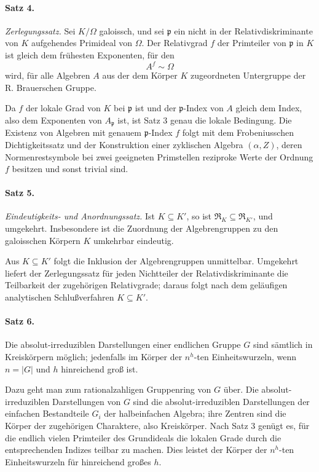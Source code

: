 \documentclass[11pt]{article}
\providecommand{\Om}{\Omega}
\begin{document}
\paragraph{Satz 4.}
\emph{Zerlegungssatz.} Sei \(K/\Om\) galoissch, und sei \(\mathfrak p\) ein nicht in der Relativdiskriminante von \(K\) aufgehendes Primideal von \(\Om\). Der Relativgrad \(f\) der Primteiler von \(\mathfrak p\) in \(K\) ist gleich dem frühesten Exponenten, für den
\[
        A^f\sim\Om
\]
wird, für alle Algebren \(A\) aus der dem Körper \(K\) zugeordneten Untergruppe der R. Brauerschen Gruppe.

Da \(f\) der lokale Grad von \(K\) bei \(\mathfrak p\) ist und der \(\mathfrak p\)-Index von \(A\) gleich dem Index, also dem Exponenten von \(A_{\mathfrak p}\) ist, ist Satz 3 genau die lokale Bedingung. Die Existenz von Algebren mit genauem \(\mathfrak p\)-Index \(f\) folgt mit dem Frobeniusschen Dichtigkeitssatz und der Konstruktion einer zyklischen Algebra \((\alpha,Z)\), deren Normenrestsymbole bei zwei geeigneten Primstellen reziproke Werte der Ordnung \(f\) besitzen und sonst trivial sind.

\paragraph{Satz 5.}
\emph{Eindeutigkeits- und Anordnungssatz.} Ist \(K\subseteq K'\), so ist \(\mathfrak R_K\subseteq\mathfrak R_{K'}\), und umgekehrt. Insbesondere ist die Zuordnung der Algebrengruppen zu den galoisschen Körpern \(K\) umkehrbar eindeutig.

Aus \(K\subseteq K'\) folgt die Inklusion der Algebrengruppen unmittelbar. Umgekehrt liefert der Zerlegungssatz für jeden Nichtteiler der Relativdiskriminante die Teilbarkeit der zugehörigen Relativgrade; daraus folgt nach dem geläufigen analytischen Schlußverfahren \(K\subseteq K'\).

\paragraph{Satz 6.}
Die absolut-irreduziblen Darstellungen einer endlichen Gruppe \(G\) sind sämtlich in Kreiskörpern möglich; jedenfalls im Körper der \(n^h\)-ten Einheitswurzeln, wenn \(n=|G|\) und \(h\) hinreichend groß ist.

Dazu geht man zum rationalzahligen Gruppenring von \(G\) über. Die absolut-irreduziblen Darstellungen von \(G\) sind die absolut-irreduziblen Darstellungen der einfachen Bestandteile \(G_i\) der halbeinfachen Algebra; ihre Zentren sind die Körper der zugehörigen Charaktere, also Kreiskörper. Nach Satz 3 genügt es, für die endlich vielen Primteiler des Grundideals die lokalen Grade durch die entsprechenden Indizes teilbar zu machen. Dies leistet der Körper der \(n^h\)-ten Einheitswurzeln für hinreichend großes \(h\).
\end{document}
